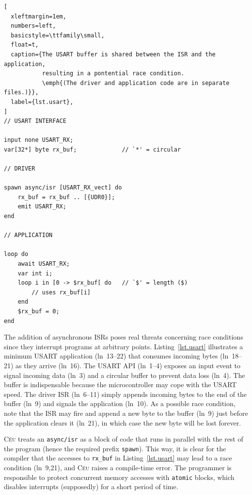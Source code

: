 \documentclass[sigplan,10pt,review,anonymous]{acmart}\settopmatter{printfolios=true,printccs=false,printacmref=false}
\newcommand{\CEU}{\textsc{C\'{e}u}\xspace}
\newcommand{\code}[1] {{\small{\texttt{#1}}}}
\begin{document}
\begin{lstlisting}[
  xleftmargin=1em,
  numbers=left,
  basicstyle=\ttfamily\small,
  float=t,
  caption={The USART buffer is shared between the ISR and the application,
           resulting in a pontential race condition.
           \emph{(The driver and application code are in separate files.)}},
  label={lst.usart},
]
// USART INTERFACE

input none USART_RX;
var[32*] byte rx_buf;             // `*' = circular

// DRIVER

spawn async/isr [USART_RX_vect] do
    rx_buf = rx_buf .. [{UDR0}];
    emit USART_RX;
end

// APPLICATION

loop do
    await USART_RX;
    var int i;
    loop i in [0 -> $rx_buf[ do   // `$' = length ($)
        // uses rx_buf[i]
    end
    $rx_buf = 0;
end
\end{lstlisting}

The addition of asynchronous ISRs poses real threats concerning race conditions
since they interrupt programs at arbitrary points.
%
Listing~\ref{lst.usart} illustrates a minimum USART application (ln~13--22)
that consumes incoming bytes (ln~18--21) as they arrive (ln~16).
%
The USART API (ln~1--4) exposes an input event to signal incoming data (ln~3)
and a circular buffer to prevent data loss (ln~4).
The buffer is indispensable because the microcontroller may cope with the USART 
speed.
%
The driver ISR (ln~6--11) simply appends incoming bytes to the end of the
buffer (ln~9) and signals the application (ln~10).
%
As a possible race condition, note that the ISR may fire and append a new byte
to the buffer (ln~9) just before the application clears it (ln~21), in which
case the new byte will be lost forever.

\CEU treats an \code{async/isr} as a block of code that runs in parallel with
the rest of the program (hence the required prefix \code{spawn}).
%
This way, it is clear for the compiler that the accesses to \code{rx\_buf} in
Listing~\ref{lst.usart} may lead to a race condition (ln~9,21), and \CEU raises
a compile-time error.
%
The programmer is responsible to protect concurrent memory accesses with
\code{atomic} blocks, which disables interrupts (supposedly) for a short period
of time.
\end{document}
